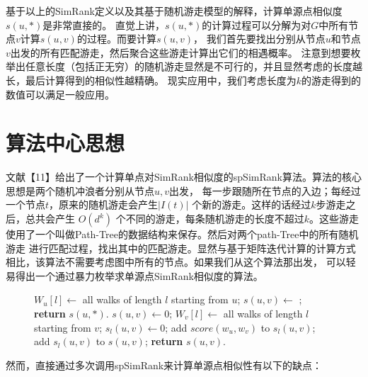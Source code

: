 \documentclass[master]{njuthesis}
\begin{document}
基于以上的SimRank定义以及其基于随机游走模型的解释，计算单源点相似度 $s(u,*)$是非常直接的。
直觉上讲，$s(u,*)$的计算过程可以分解为对$G$中所有节点$v$计算$s(u,v)$的过程。而要计算$s(u,v)$，
我们首先要找出分别从节点$u$和节点$v$出发的所有匹配游走，然后聚合这些游走计算出它们的相遇概率。
注意到想要枚举出任意长度（包括正无穷）的随机游走显然是不可行的，并且显然考虑的长度越长，最后计算得到的相似性越精确。
现实应用中，我们考虑长度为$k$的游走得到的数值可以满足一般应用。
\section{算法中心思想}
文献【11】给出了一个计算单点对SimRank相似度的spSimRank算法。算法的核心思想是两个随机冲浪者分别从节点$u,v$出发，
每一步跟随所在节点的入边；每经过一个节点$t$，原来的随机游走会产生$|I(t)|$ 个新的游走。这样的话经过$k$步游走之后，总共会产生
$O(d^k)$ 个不同的游走，每条随机游走的长度不超过$k$。这些游走使用了一个叫做Path-Tree的数据结构来保存。然后对两个path-Tree中的所有随机游走
进行匹配过程，找出其中的匹配游走。显然与基于矩阵迭代计算的计算方式相比，该算法不需要考虑图中所有的节点。如果我们从这个算法那出发，
可以轻易得出一个通过暴力枚举求单源点SimRank相似度的算法。

\begin{figure}
\begin{algorithm}[H]
\label{algo:nssSimRank}
\begin{algorithmic}[1]
		\State $W_u[l] \gets $ all walks of length $l$ starting from $u$;
	\EndFor
		\State $s(u,v)\gets$  ;
	\EndFor
	\State \textbf{return} $s(u, *)$.
\EndProcedure
{}
\State $s(u, v) \gets 0$;
	\State $W_v[l] \gets $ all walks of length $l$ starting from $v$;
	\State $s_l(u, v) \gets 0$;
			\State add  $score(w_u, w_v)$ to  $s_l(u, v)$;
		\EndIf
		\EndFor
	\EndFor
	\State add $s_l(u, v)$ to $s(u, v)$;
\EndFor
\State \textbf{return} $s(u, v)$.
\EndProcedure
\end{algorithmic}
\end{algorithm}
\end{figure}
然而，直接通过多次调用spSimRank来计算单源点相似性有以下的缺点：
\end{document}
